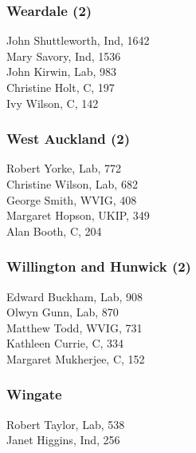 \documentclass[a4paper,openany,10pt]{book}
\begin{document}
\subsubsection*{Weardale (2)}



John Shuttleworth, Ind, 1642\\
Mary Savory, Ind, 1536\\
John Kirwin, Lab, 983\\
Christine Holt, C, 197\\
Ivy Wilson, C, 142\\


\subsubsection*{West Auckland (2)}



Robert Yorke, Lab, 772\\
Christine Wilson, Lab, 682\\
George Smith, WVIG, 408\\
Margaret Hopson, UKIP, 349\\
Alan Booth, C, 204\\


\subsubsection*{Willington and Hunwick (2)}



Edward Buckham, Lab, 908\\
Olwyn Gunn, Lab, 870\\
Matthew Todd, WVIG, 731\\
Kathleen Currie, C, 334\\
Margaret Mukherjee, C, 152\\


\subsubsection*{Wingate}



Robert Taylor, Lab, 538\\
Janet Higgins, Ind, 256\\
\end{document}
